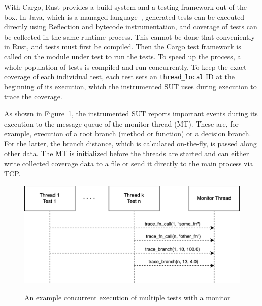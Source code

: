 \documentclass{article}
\begin{document}
With Cargo, Rust provides a build system and a testing framework out-of-the-box. In Java, which is a managed language~\cite{Gough2005}, generated tests can be executed directly using Reflection and bytecode instrumentation, and coverage of tests can be collected in the same runtime process. This cannot be done that conveniently in Rust, and tests must first be compiled. Then the Cargo test framework is called on the module under test to run the tests. To speed up the process, a whole population of tests is compiled and run concurrently. To keep the exact coverage of each individual test, each test sets an \lstinline{thread_local} ID at the beginning of its execution, which the instrumented \ac{SUT} uses during execution to trace the coverage. 


As shown in Figure~\ref{fig:test-execution}, the instrumented \ac{SUT} reports important events during its execution to the message queue of the monitor thread (MT). These are, for example, execution of a root branch (method or function) or a decision branch. For the latter, the branch distance, which is calculated on-the-fly, is passed along other data. The MT is initialized before the threads are started and can either write collected coverage data to a file or send it directly to the main process via TCP.

\begin{figure}[h]
\caption{An example concurrent execution of multiple tests with a monitor}
\centering
\includegraphics[width=\textwidth]{test-execution}
\label{fig:test-execution}
\end{figure}
\end{document}
